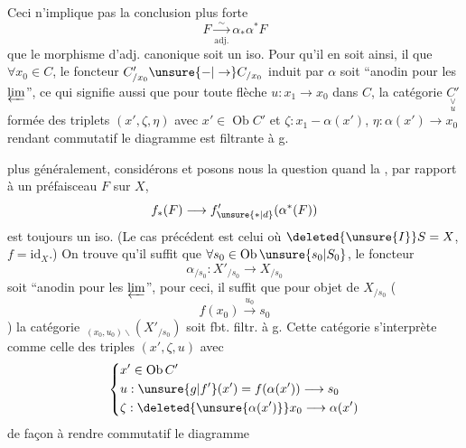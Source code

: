 Ceci n'implique pas la conclusion plus forte
\[
 F\xrightarrow[\mathrm{adj.}]{\sim}\alpha_*\alpha^*F
\]
que le morphisme d'adj. canonique soit un iso. Pour qu'il en soit ainsi, il   que $\forall x_0\in C$, le foncteur  $C'_{/x_0}\unsure{-|\to}C_{/x_0}$ induit par $\alpha$ soit ``anodin pour les $\varprojlim$'', ce qui signifie aussi que pour toute flèche $u:x_1\longrightarrow x_0$ dans $C$, la catégorie $\underset{u}{\underset{\vee}{C'}}$ formée des triplets $(x',\zeta,\eta)$ avec $x'\in\operatorname{Ob}C'$ et $\zeta:x_1-\alpha(x')$, $\eta:\alpha(x')\longrightarrow x_0$ rendant commutatif
le diagramme
est  filtrante à g.

plus généralement, considérons
et posons nous la question quand la  , par rapport à un préfaisceau $F$  sur $X$,
\[
 f_*(F)\longrightarrow f'_{\unsure{*|d}}(\alpha^*(F))
\]
est toujours un iso. (Le cas précédent est celui où $\deleted{\unsure{I}}S=X$, $f=\mathrm{id}_X$.) On trouve qu'il suffit que $\forall s_0\in\operatorname{Ob}\unsure{s_0|S_0}$, le foncteur
\[
 \alpha_{/s_0}:X'_{/s_0}\longrightarrow X_{/s_0}
\]
soit ``anodin pour les $\varprojlim$'',  pour ceci, il suffit que pour objet  de $X_{/s_0}$ (
\[
 f(x_0)\xrightarrow{u_0}s_0
\]
) la catégorie $\,{}_{(x_0,u_0)\backslash}(X'_{/s_0})$ soit fbt. filtr. à g.
Cette catégorie s'interprète comme celle des triples $(x',\zeta,u)$ avec
\[
\left\{\begin{aligned}
 &x'\in\operatorname{Ob}C'\\
 &u:\unsure{g|f'}(x')=f(\alpha(x'))\longrightarrow s_0\\
 &\zeta:\deleted{\unsure{\alpha(x')}}x_0\longrightarrow\alpha(x')
\end{aligned}\right.
\]
de façon à rendre commutatif le diagramme


